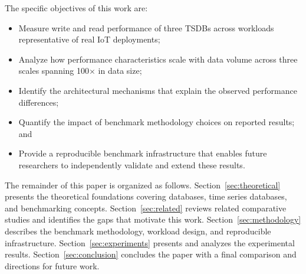 The specific objectives of this work are:
\begin{itemize}
  \item Measure write and read performance of three TSDBs across workloads representative of
  real IoT deployments;
  \item Analyze how performance characteristics scale with data volume across three scales
  spanning 100$\times$ in data size;
  \item Identify the architectural mechanisms that explain the observed performance differences;
  \item Quantify the impact of benchmark methodology choices on reported results; and
  \item Provide a reproducible benchmark infrastructure that enables future researchers to
  independently validate and extend these results.
\end{itemize}

The remainder of this paper is organized as follows.
Section~\ref{sec:theoretical} presents the theoretical foundations covering databases,
time series databases, and benchmarking concepts.
Section~\ref{sec:related} reviews related comparative studies and identifies the gaps that
motivate this work.
Section~\ref{sec:methodology} describes the benchmark methodology, workload design, and
reproducible infrastructure.
Section~\ref{sec:experiments} presents and analyzes the experimental results.
Section~\ref{sec:conclusion} concludes the paper with a final comparison and directions
for future work.
